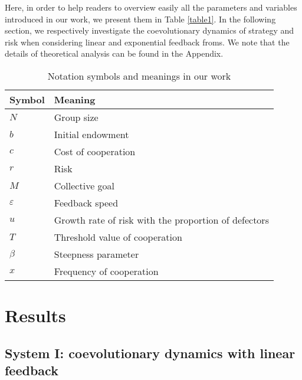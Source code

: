 \documentclass[9pt]{elife}
\begin{document}
Here, in order to help readers to overview easily all the parameters and variables introduced in our work, we present them in Table \ref{table1}. In the following section, we respectively investigate the coevolutionary dynamics of strategy and risk when considering linear and exponential feedback froms. We note that the details of theoretical analysis can be found in the Appendix.




\begin{table}[!htb]
  \centering
  \caption{Notation symbols and meanings in our work}\label{table1}
  \label{tab1}
  \begin{tabular}{l|l}
    \hline
    Symbol        & Meaning  \\ \hline
    $N$            & Group size  \\ \hline
    $b$            & Initial endowment  \\ \hline
    $c$            & Cost of cooperation  \\ \hline
    $r$            & Risk\\ \hline
    $M$            & Collective goal \\ \hline
    $\varepsilon$  & Feedback speed \\ \hline
    $u$            & Growth rate of risk with the proportion of defectors \\ \hline
    $T$            & Threshold value of cooperation \\ \hline
    $\beta$        & Steepness parameter \\ \hline
    $x$            & Frequency of cooperation \\ \hline
  \end{tabular}
\end{table}

\section{Results}

\subsection{System I: coevolutionary dynamics with linear feedback}
\end{document}
